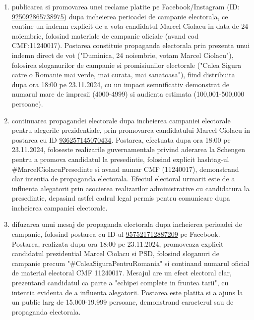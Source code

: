 \documentclass[a4paper,12pt]{article}
\begin{document}
\begin{enumerate}[leftmargin=*, label=\arabic*.)]
    \item publicarea si promovarea unei reclame platite pe Facebook/Instagram (ID: \href{https://www.facebook.com/ads/library/?id=925092865738975}{925092865738975}) dupa incheierea perioadei de campanie electorala, ce contine un indemn explicit de a vota candidatul Marcel Ciolacu in data de 24 noiembrie, folosind materiale de campanie oficiale (avand cod CMF:11240017). Postarea constituie propaganda electorala prin prezenta unui indemn direct de vot ("Duminica, 24 noiembrie, votam Marcel Ciolacu"), folosirea sloganurilor de campanie si promisiunilor electorale ("Calea Sigura catre o Romanie mai verde, mai curata, mai sanatoasa"), fiind distribuita dupa ora 18:00 pe 23.11.2024, cu un impact semnificativ demonstrat de numarul mare de impresii (4000-4999) si audienta estimata (100,001-500,000 persoane).
    \item continuarea propagandei electorale dupa incheierea campaniei electorale pentru alegerile prezidentiale, prin promovarea candidatului Marcel Ciolacu in postarea cu ID \href{https://www.facebook.com/ads/library/?id=936257145070434}{936257145070434}. Postarea, efectuata dupa ora 18:00 pe 23.11.2024, foloseste realizarile guvernamentale privind aderarea la Schengen pentru a promova candidatul la presedintie, folosind explicit hashtag-ul \#MarcelCiolacuPresedinte si avand numar CMF (11240017), demonstrand clar intentia de propaganda electorala. Efectul electoral urmarit este de a influenta alegatorii prin asocierea realizarilor administrative cu candidatura la presedintie, depasind astfel cadrul legal permis pentru comunicare dupa incheierea campaniei electorale.
    \item difuzarea unui mesaj de propaganda electorala dupa incheierea perioadei de campanie, folosind postarea cu ID-ul \href{https://www.facebook.com/ads/library/?id=957521712887209}{957521712887209} pe Facebook. Postarea, realizata dupa ora 18:00 pe 23.11.2024, promoveaza explicit candidatul prezidential Marcel Ciolacu si PSD, folosind sloganuri de campanie precum "\#CaleaSiguraPentruRomania" si continand numarul oficial de material electoral CMF 11240017. Mesajul are un efect electoral clar, prezentand candidatul ca parte a "echipei complete in fruntea tarii", cu intentia evidenta de a influenta alegatorii. Postarea este platita si a ajuns la un public larg de 15.000-19.999 persoane, demonstrand caracterul sau de propaganda electorala.
\end{enumerate}

\vspace{0.5cm}
\end{document}

